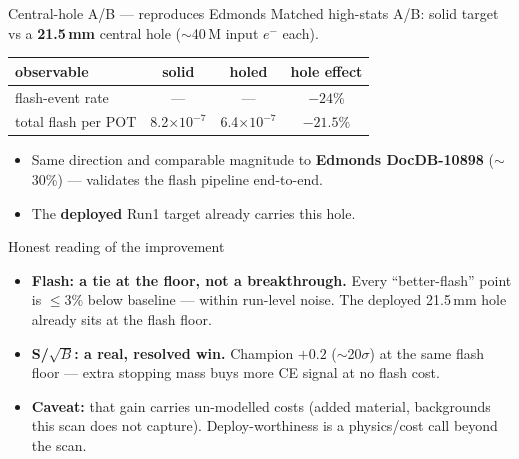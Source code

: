 \documentclass[aspectratio=169,10pt]{beamer}
\begin{document}
\begin{frame}{Central-hole A/B --- reproduces Edmonds}
Matched high-stats A/B: solid target vs a \textbf{21.5\,mm} central hole
($\sim$40\,M input $e^-$ each).
\vspace{1em}
\begin{center}
\begin{tabular}{lccc}
\toprule
observable & solid & holed & hole effect \\
\midrule
flash-event rate    & ---                  & ---                  & \textbf{$-24\%$} \\
total flash per POT & 8.2$\times10^{-7}$   & 6.4$\times10^{-7}$   & \textbf{$-21.5\%$} \\
\bottomrule
\end{tabular}
\end{center}
\vspace{1em}
\begin{itemize}\footnotesize
  \item Same direction and comparable magnitude to \textbf{Edmonds DocDB-10898}
        ($\sim$30\%) --- validates the flash pipeline end-to-end.
  \item The \textbf{deployed} Run1 target already carries this hole.
\end{itemize}
\end{frame}

\begin{frame}{Honest reading of the improvement}
\begin{itemize}
  \item \textbf{Flash: a tie at the floor, not a breakthrough.}
        Every ``better-flash'' point is $\le3\%$ below baseline --- within run-level noise.
        The deployed 21.5\,mm hole already sits at the flash floor.
  \vspace{0.5em}
  \item \textbf{S/$\sqrt{B}$: a real, resolved win.} Champion $+0.2$ ($\sim$20$\sigma$) at the
        same flash floor --- extra stopping mass buys more CE signal at no flash cost.
  \vspace{0.5em}
  \item \textbf{Caveat:} that gain carries un-modelled costs (added material, backgrounds this
        scan does not capture). Deploy-worthiness is a physics/cost call beyond the scan.
\end{itemize}
\end{frame}
\end{document}
